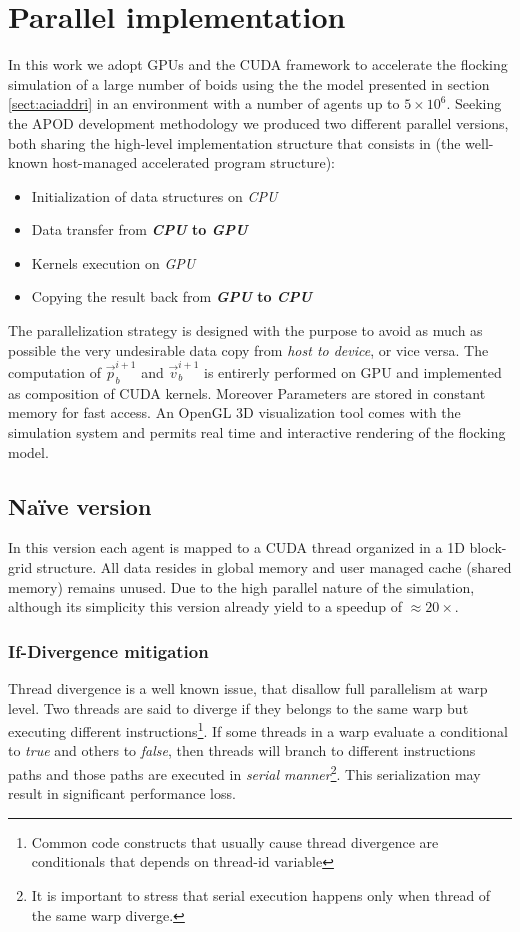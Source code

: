 \section{Parallel implementation}
\label{sect:gpuimplementation}
In this work we adopt GPUs and the CUDA framework to accelerate the flocking
simulation of a large number of boids using the the model presented in section
\ref{sect:aciaddri} in an environment with a number of agents up to $5
\times10^6$.
Seeking the APOD development methodology we produced two different parallel
versions, both sharing the high-level implementation structure that consists in
(the well-known host-managed accelerated program structure):
\begin{itemize}
	\item Initialization of data structures on \emph{CPU}
	\item Data transfer from \textbf{\emph{CPU} to \emph{GPU}}
	\item Kernels execution on \emph{GPU}
	\item Copying the result back from \textbf{\emph{GPU} to \emph{CPU}}
\end{itemize}
The parallelization strategy is designed with the purpose to avoid as much
as possible the very undesirable data copy from \emph{host to device}\cite{cita}, or vice versa.
The computation of $\vec{p}_b^{i+1}$ and $\vec{v}_b^{i+1}$ is entirerly performed on GPU and implemented as composition of CUDA kernels. Moreover Parameters are stored in constant memory for fast access.
An OpenGL 3D visualization tool comes with the simulation system and permits real time and interactive 
rendering of the flocking model.

\subsection{Na\"{i}ve version}
In this version each agent is mapped to a CUDA thread organized in a 1D block-grid structure.
All data resides in global memory and user managed cache (shared memory) remains unused. 
Due to the high parallel nature of the simulation, although its simplicity this version already yield to a speedup of $\approx20 \times$. 

\subsubsection*{If-Divergence mitigation} Thread divergence is a well known
issue, that disallow full parallelism at warp level. Two threads are said to
diverge if they belongs to the same warp but executing different
instructions\footnote{Common code constructs that usually cause thread
divergence are conditionals that depends on  thread-id variable}. If some
threads in a warp evaluate a conditional to \emph{true} and others to \emph{false}, then threads will branch to different instructions paths
and those paths are executed in \emph{serial manner}\footnote{It is important to
stress that serial execution happens only when thread of the same warp
diverge.}\cite{CUDA1}. This serialization may result in significant performance
loss.

